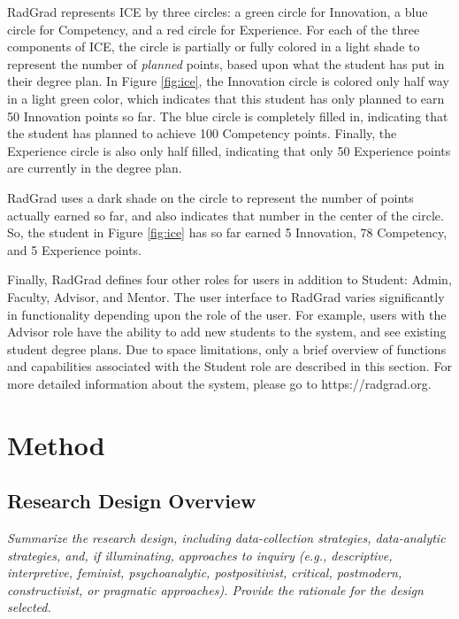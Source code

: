 \documentclass[acmsmall]{acmart}
\begin{document}
RadGrad represents ICE by three circles: a green circle for Innovation, a blue circle for Competency, and a red circle for Experience. For each of the three components of ICE, the circle is partially or fully colored in a light shade to represent the number of {\em planned} points, based upon what the student has put in their degree plan. In Figure \ref{fig:ice}, the Innovation circle is colored only half way in a light green color, which indicates that this student has only planned to earn 50 Innovation points so far.  The blue circle is completely filled in, indicating that the student has planned to achieve 100 Competency points.  Finally, the Experience circle is also only half filled, indicating that only 50 Experience points are currently in the degree plan.

RadGrad uses a dark shade on the circle to represent the number of points actually earned so far, and also indicates that number in the center of the circle. So, the student in Figure \ref{fig:ice} has so far earned 5 Innovation, 78 Competency, and 5 Experience points.

Finally, RadGrad defines four other roles for users in addition to Student: Admin, Faculty, Advisor, and Mentor. The user interface to RadGrad varies significantly in functionality depending upon the role of the user.  For example, users with the Advisor role have the ability to add new students to the system, and see existing student degree plans. Due to space limitations, only a brief overview of functions and capabilities associated with the Student role are described in this section. For more detailed information about the system, please go to https://radgrad.org.




\section{Method}
\label{sec:method}

\subsection{Research Design Overview}

{\em\small  Summarize the research design, including data-collection strategies, data-analytic strategies, and, if illuminating, approaches to inquiry (e.g., descriptive, interpretive, feminist, psychoanalytic, postpositivist, critical, postmodern, constructivist, or pragmatic approaches). Provide the rationale for the design selected.}
\end{document}
